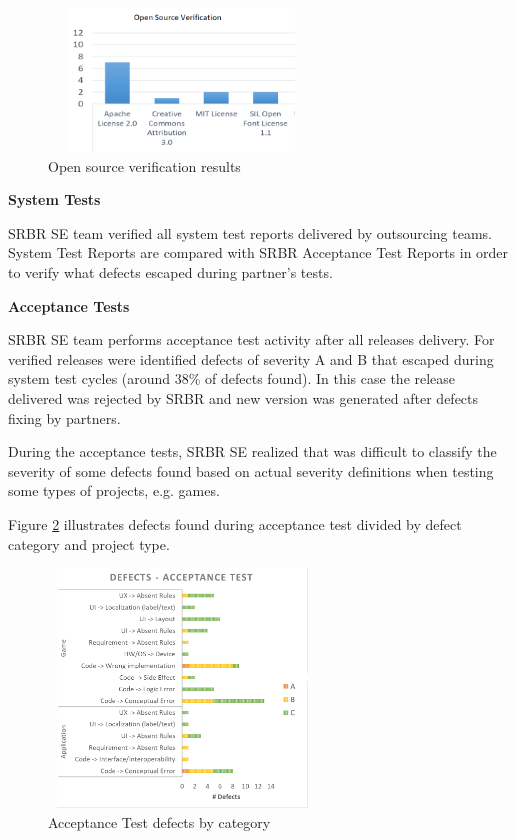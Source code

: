\begin{figure}[!h]
\includegraphics[height=1.5in, width=2.8in]{OpenSource}
\caption{Open source verification results}
\label{fig:opensource}
\end{figure}

\textbf{System Tests}

SRBR SE team verified all system test reports delivered by outsourcing teams. System Test Reports are compared with SRBR Acceptance Test Reports in order to verify what defects escaped during partner's tests. 

\textbf{Acceptance Tests}

SRBR SE team performs acceptance test activity after all releases delivery. For verified releases were identified defects of severity A and B that escaped during system test cycles (around 38\% of defects found). In this case the release delivered was rejected by SRBR and new version was generated after defects fixing by partners. 

During the acceptance tests, SRBR SE realized that was difficult to classify the severity of some defects found based on actual severity definitions when testing some types of projects, e.g. games.

Figure \ref{fig:accept-testing} illustrates defects found during acceptance test divided by defect category and project type.

\begin{figure}[!h]
\includegraphics[height=2.5in, width=2.8in]{AcceptanceTest}
\caption{Acceptance Test defects by category}
\label{fig:accept-testing}
\end{figure}

